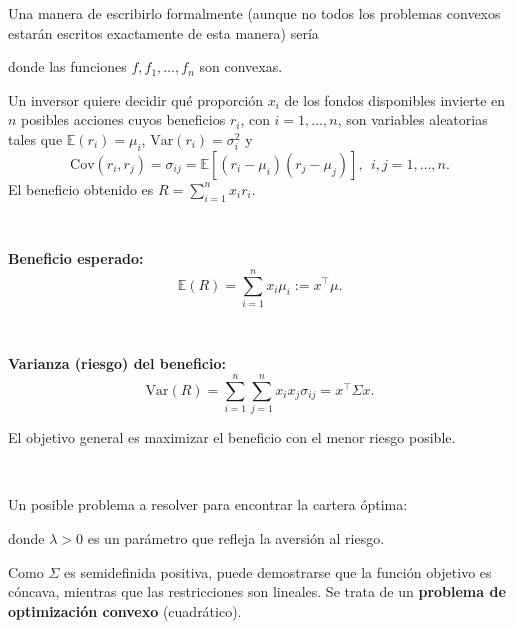 Una manera de escribirlo formalmente (aunque no todos los problemas convexos estarán escritos exactamente de esta manera) sería
\begin{ioprob}
donde las funciones $f,f_1,\ldots, f_n$ son convexas.
\end{ioprob}


\begin{example}

Un inversor quiere decidir qué proporción  $x_i$ de los fondos disponibles invierte
en $n$ posibles acciones cuyos beneficios $r_i$, con $i=1,\ldots,n$, son variables aleatorias tales que $\mathbb{E}(r_i)=\mu_i$, $\mbox{Var}(r_i)=\sigma^2_i$ y 
\[
\mbox{Cov}(r_i,r_j) = \sigma_{ij} = \mathbb{E}[(r_i-\mu_i)(r_j-\mu_j)], \ \ i,j=1,\ldots, n.
\]
El beneficio obtenido es $R=\sum_{i=1}^n x_ir_i$.


\

\textbf{Beneficio esperado:} 
\[
\mathbb{E}(R)=\sum_{i=1}^n x_i\mu_i := x^\top \mu.
\]

\

\textbf{Varianza (riesgo) del beneficio:}
\[
\mbox{Var}(R) = \sum_{i=1}^n \sum_{j=1}^n x_ix_j\sigma_{ij} = x^\top\Sigma x.
\]

El objetivo general es maximizar el beneficio con el menor riesgo posible.

\

Un posible problema a resolver para encontrar la cartera óptima:
\begin{ioprob}
donde $\lambda>0$ es un parámetro que refleja la aversión al riesgo.
\end{ioprob}

Como $\Sigma$ es semidefinida positiva, puede demostrarse que la función objetivo es cóncava, mientras que las restricciones son lineales. Se trata de un \textbf{problema de optimización convexo} (cuadrático).


\end{example}
